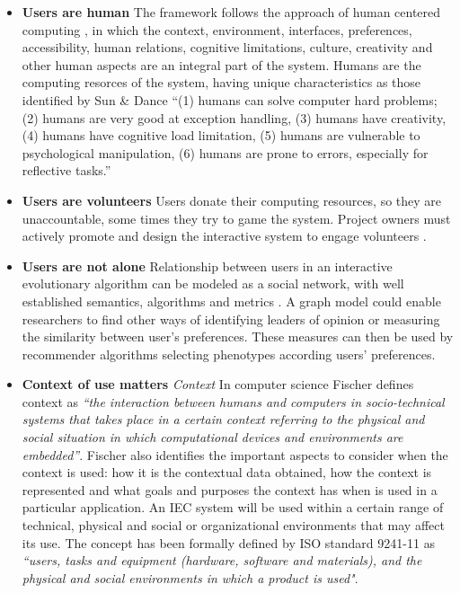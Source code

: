 \begin{itemize}
\item {\bf Users are human} 
  The framework follows the approach of human centered computing \cite{sebe2010human},
  in which the context, environment, interfaces, preferences, accessibility, human relations, cognitive
  limitations, culture, creativity and other human aspects are an integral part of the system.
  Humans are the computing resorces of the system, having unique characteristics as those identified by 
  Sun \& Dance \cite{Sun2013}  ``(1) humans can solve computer hard problems; (2) humans are very good at exception handling, (3) humans have creativity, (4) humans have cognitive load limitation, (5) humans are vulnerable to 
  psychological manipulation, (6) humans are prone to errors, especially for reflective tasks.''


\item {\bf Users are volunteers} Users donate their computing resources, so they are unaccountable, 
  some times they try to game the system. Project owners must actively promote and design the interactive
  system to engage volunteers \cite{oh2015clicking}. %

\item {\bf Users are not alone}
  Relationship between users in an interactive evolutionary algorithm can be modeled
  as a social network, with well established semantics, algorithms and metrics \cite{ahuja1993network}.
  A graph model could enable researchers to find other ways of identifying leaders of 
  opinion or measuring the similarity between user's preferences. 
  These measures can then be used by recommender algorithms selecting 
  phenotypes according users' preferences. 

\item {\bf Context of use matters}
  \textit{Context} In computer science Fischer \cite{fischer2012context}
  defines context as \textit{``the interaction between humans and
  computers in socio-technical systems that takes place in a certain
  context referring to the physical and social situation in which
  computational devices and environments are embedded''}. 
  Fischer also identifies the important aspects to consider when the context is used: how it is
  the contextual data obtained, how the context is represented and what
  goals and purposes the context has when is used in a particular
  application.   An IEC system will  be used within a certain range of technical, physical and social or
  organizational environments \cite{maguire2001context} that may affect its use.
  The concept has been formally defined
  by ISO standard 9241-11 \cite{international1998iso} as \textit{``users,
  tasks and equipment (hardware, software and materials), and the
  physical and social environments in which a product is used"}.  


\end{itemize}
